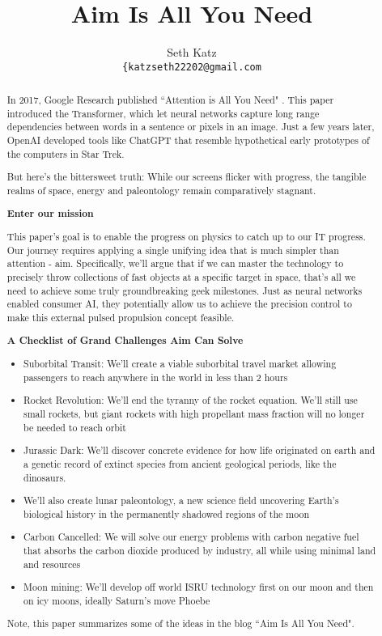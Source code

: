 \documentclass{article}
\title{Aim Is All You Need}
\author{
  Seth Katz \\
  \texttt{\{katzseth22202@gmail.com} \\
}
\begin{document}
\maketitle

\begin{abstract}
 In 2017, Google Research published ``Attention is All You Need" \cite{vaswani2023attentionneed}.  This paper introduced the Transformer, which let neural networks capture long range dependencies between words in a sentence or pixels in an image.   Just a few years later, OpenAI developed tools like ChatGPT that resemble hypothetical early prototypes of the computers in Star Trek.

But here's the bittersweet truth:  While our screens flicker with progress, the tangible realms of space, energy and paleontology remain comparatively stagnant.

\textbf{Enter our mission}

This paper's goal is to enable the progress on physics to catch up to our IT progress.  Our journey requires applying a single unifying idea that is much simpler than attention - aim.   Specifically, we'll argue that if we can master the technology to precisely throw collections of fast objects at a specific target in space, that's all we need to achieve some truly groundbreaking geek milestones.   Just as neural networks enabled consumer AI, they potentially allow us to achieve the precision control to make this external pulsed propulsion concept feasible.

\textbf{A Checklist of Grand Challenges Aim Can Solve}
\begin{itemize}
    \item 
Suborbital Transit:  We'll create a viable suborbital travel market allowing passengers to reach anywhere in the world in less than 2 hours
 \item Rocket Revolution: We'll end the tyranny of the rocket equation.   We'll still use small rockets, but giant rockets with high propellant mass fraction will no longer be needed to reach orbit
  \item Jurassic Dark: We'll discover concrete evidence for how life originated on earth and a genetic record of extinct species from ancient geological periods, like the dinosaurs. \item We'll also create lunar paleontology, a new science field uncovering Earth's biological history in the permanently shadowed regions of the moon
  \item Carbon Cancelled: We will solve our energy problems with carbon negative fuel that absorbs the carbon dioxide produced by industry, all while using minimal land and resources
  \item Moon mining:  We'll develop off world ISRU technology first on our moon and then on icy moons, ideally Saturn's move Phoebe
\end{itemize}
Note, this paper summarizes some of the ideas in the blog ``Aim Is All You Need"\cite{aim2024}.
\end{abstract}
\end{document}
